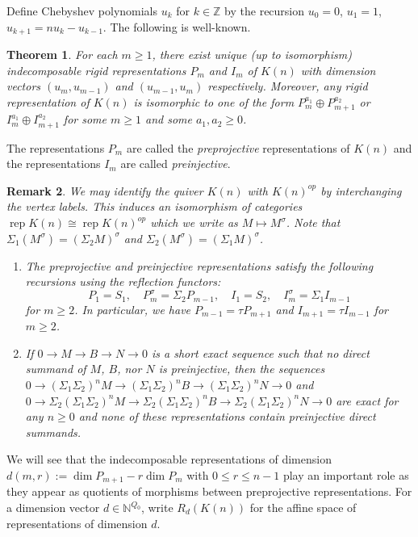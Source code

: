\documentclass{amsart}
\newtheorem{theorem}{Theorem}[section]
\newtheorem{remark}[theorem]{Remark}
\newcommand{\rep}{\operatorname{rep}}
\newcommand{\ZZ}{\mathbb{Z}}
\newcommand{\NN}{\mathbb{N}}
\newcommand{\ses}[3]{0\rightarrow #1\rightarrow #2\rightarrow#3\rightarrow 0}
\begin{document}
Define Chebyshev polynomials $u_k$ for $k\in\ZZ$ by the recursion $u_0=0$, $u_1=1$, $u_{k+1}=nu_k-u_{k-1}$.
The following is well-known.
\begin{theorem}
  \label{th:rigids}
  For each $m\ge1$, there exist unique (up to isomorphism) indecomposable rigid representations $P_m$ and $I_m$ of $K(n)$ with dimension vectors $(u_m,u_{m-1})$ and $(u_{m-1},u_m)$ respectively. 
  Moreover, any rigid representation of $K(n)$ is isomorphic to one of the form $P_m^{a_1}\oplus P_{m+1}^{a_2}$ or $I_m^{a_1}\oplus I_{m+1}^{a_2}$ for some $m\ge1$ and some $a_1,a_2\ge0$.
\end{theorem}
The representations $P_m$ are called the \emph{preprojective} representations of $K(n)$ and the representations $I_m$ are called \emph{preinjective}.
\begin{remark}
  \label{rem:reflection recursion}
  We may identify the quiver $K(n)$ with $K(n)^{op}$ by interchanging the vertex labels.
  This induces an isomorphism of categories $\rep K(n)\cong\rep K(n)^{op}$ which we write as $M\mapsto M^\sigma$.
  Note that $\Sigma_1(M^\sigma)=(\Sigma_2 M)^\sigma$ and $\Sigma_2(M^\sigma)=(\Sigma_1 M)^\sigma$.
  \begin{enumerate}
    \item The preprojective and preinjective representations satisfy the following recursions using the reflection functors:
      \[P_1=S_1,\quad P_m^\sigma=\Sigma_2 P_{m-1},\quad I_1=S_2,\quad I_m^\sigma=\Sigma_1 I_{m-1}\]
      for $m\ge2$.
      In particular, we have $P_{m-1}=\tau P_{m+1}$ and $I_{m+1}=\tau I_{m-1}$ for $m\ge2$.
    \item If $\ses{M}{B}{N}$ is a short exact sequence such that no direct summand of $M$, $B$, nor $N$ is preinjective, then the sequences $\ses{(\Sigma_1\Sigma_2)^nM}{(\Sigma_1\Sigma_2)^nB}{(\Sigma_1\Sigma_2)^nN}$ and $\ses{\Sigma_2(\Sigma_1\Sigma_2)^nM}{\Sigma_2(\Sigma_1\Sigma_2)^nB}{\Sigma_2(\Sigma_1\Sigma_2)^nN}$ are exact for any $n\ge0$ and none of these representations contain preinjective direct summands.
  \end{enumerate}
\end{remark}
We will see that the indecomposable representations of dimension $d(m,r):=\dim P_{m+1}-r\dim P_m$ with $0\leq r\leq n-1$ play an important role as they appear as quotients of morphisms between preprojective representations.
For a dimension vector $d\in\NN^{Q_0}$, write $R_d(K(n))$ for the affine space of representations of dimension $d$.
\end{document}
